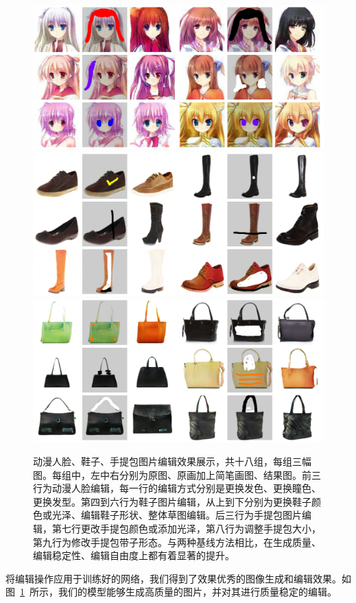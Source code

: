 \documentclass[a4paper,12pt,UTF8]{ctexart}
\newcommand{\kai}{\CJKfamily{zhkai}}	%
\begin{document}
\begin{figure}[H]
  \centering
  \includegraphics[width=0.9\linewidth]{figs/pic.png}
  \includegraphics[width=0.9\linewidth]{figs/shoes.png}
  \includegraphics[width=0.9\linewidth]{figs/handbags.png}
  \caption{\kai 动漫人脸、鞋子、手提包图片编辑效果展示，共十八组，每组三幅图。每组中，左中右分别为原图、原画加上简笔画图、结果图。前三行为动漫人脸编辑，每一行的编辑方式分别是更换发色、更换瞳色、更换发型。第四到六行为鞋子图片编辑，从上到下分别为更换鞋子颜色或光泽、编辑鞋子形状、整体草图编辑。后三行为手提包图片编辑，第七行更改手提包颜色或添加光泽，第八行为调整手提包大小，第九行为修改手提包带子形态。与两种基线方法相比，在生成质量、编辑稳定性、编辑自由度上都有着显著的提升。}
  \label{fig:pic}
\end{figure}

将编辑操作应用于训练好的网络，我们得到了效果优秀的图像生成和编辑效果。如图~\ref{fig:pic}~所示，我们的模型能够生成高质量的图片，并对其进行质量稳定的编辑。
\end{document}
